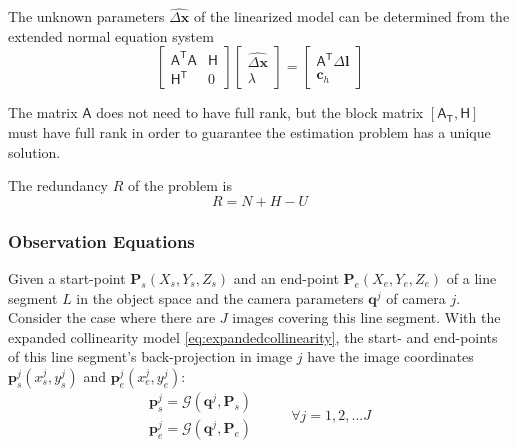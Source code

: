 

The unknown parameters $\widehat{\Delta\boldsymbol x}$ of the linearized model can be determined from the extended normal equation system
\begin{equation}
\begin{bmatrix}
\mathsf{A^TA} & \mathsf{H}\\
\mathsf{H^T} & 0
\end{bmatrix}
\begin{bmatrix}
\widehat{\Delta\boldsymbol x}\\
\lambda
\end{bmatrix}
=
\begin{bmatrix}
\mathsf{A^T}\Delta\boldsymbol l\\
\boldsymbol c_h
\end{bmatrix}
\end{equation}

The matrix $\mathsf{A}$ does not need to have full rank, but the block matrix $[\mathsf{A_T},\mathsf{H}]$ must have full rank in order to guarantee the estimation problem has a unique solution.

The redundancy $R$ of the problem is
\begin{equation}
R=N+H-U
\end{equation}


\subsubsection{Observation Equations}
\label{subsubsec:ObsEqua}

Given a start-point $\mathbf{P}_s(X_s,Y_s,Z_s)$ and an end-point $\mathbf{P}_e(X_e,Y_e,Z_e)$ of a line segment $L$ in the object space and the camera parameters $\mathbf{q}^j$ of camera $j$. Consider the case where there are $J$ images covering this line segment. With the expanded collinearity model \eqref{eq:expandedcollinearity}, the start- and end-points of this line segment's back-projection in image $j$ have the image coordinates $\mathbf{p}^j_s(x^j_s,y^j_s)$ and $\mathbf{p}^j_e(x^j_e,y^j_e)$:
\begin{equation} \label{eq:obsmodel-collinearity}
\begin{split}
\mathbf{p}^j_s = \mathcal{G}(\mathbf{q}^j,\mathbf{P}_s)\\
\mathbf{p}^j_e = \mathcal{G}(\mathbf{q}^j,\mathbf{P}_e)
\end{split}
\qquad
\begin{split}
\forall j=1,2,...J
\end{split}
\end{equation}

